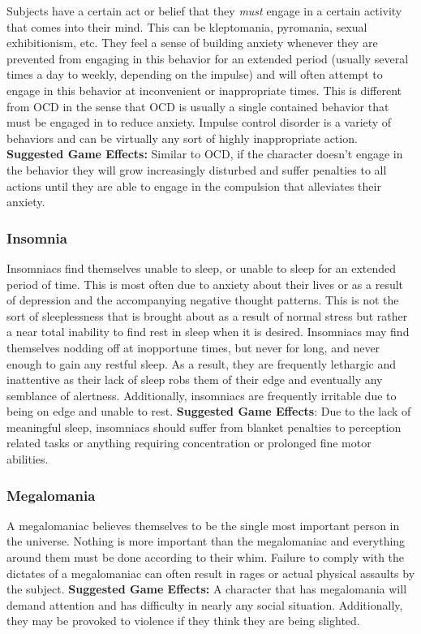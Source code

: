 Subjects have a certain act or belief that they \textit{must }
engage in a certain activity that comes into their 
mind. This can be kleptomania, pyromania, sexual 
exhibitionism, etc. They feel a sense of building 
anxiety whenever they are prevented from engaging 
in this behavior for an extended period (usually several
times a day to weekly, depending on the impulse)
and will often attempt to engage in this behavior at 
inconvenient or inappropriate times. This is different
from OCD in the sense that OCD is usually a
single contained behavior that must be engaged in to 
reduce anxiety. Impulse control disorder is a variety 
of behaviors and can be virtually any sort of highly 
inappropriate action.
\textbf{Suggested Game Effects: }Similar to OCD, if the 
character doesn't engage in the behavior they will 
grow increasingly disturbed and suffer penalties to all 
actions until they are able to engage in the compulsion
that alleviates their anxiety.

\subsubsection{Insomnia}

Insomniacs find themselves unable to sleep, or unable 
to sleep for an extended period of time. This is most 
often due to anxiety about their lives or as a result 
of depression and the accompanying negative thought 
patterns. This is not the sort of sleeplessness that is 
brought about as a result of normal stress but rather 
a near total inability to find rest in sleep when it is 
desired. Insomniacs may find themselves nodding off 
at inopportune times, but never for long, and never 
enough to gain any restful sleep. As a result, they 
are frequently lethargic and inattentive as their lack 
of sleep robs them of their edge and eventually any 
semblance of alertness. Additionally, insomniacs are 
frequently irritable due to being on edge and unable 
to rest.
\textbf{Suggested Game Effects}: Due to the lack of meaningful
sleep, insomniacs should suffer from blanket
penalties to perception related tasks or anything requiring
concentration or prolonged fine motor abilities.

\subsubsection{Megalomania}

A megalomaniac believes themselves to be the single 
most important person in the universe. Nothing is 
more important than the megalomaniac and everything
around them must be done according to their
whim. Failure to comply with the dictates of a megalomaniac
can often result in rages or actual physical
assaults by the subject.
\textbf{Suggested Game Effects: }A character that has 
megalomania will demand attention and has difficulty
in nearly any social situation. Additionally, they
may be provoked to violence if they think they are 
being slighted.

